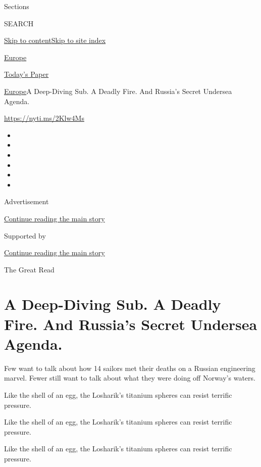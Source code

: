 Sections

SEARCH

\protect\hyperlink{site-content}{Skip to
content}\protect\hyperlink{site-index}{Skip to site index}

\href{https://www.nytimes.com/section/world/europe}{Europe}

\href{https://myaccount.nytimes.com/auth/login?response_type=cookie\&client_id=vi}{}

\href{https://www.nytimes.com/section/todayspaper}{Today's Paper}

\href{/section/world/europe}{Europe}\textbar{}A Deep-Diving Sub. A
Deadly Fire. And Russia's Secret Undersea Agenda.

\url{https://nyti.ms/2Klw4Ms}

\begin{itemize}
\item
\item
\item
\item
\item
\item
\end{itemize}

Advertisement

\protect\hyperlink{after-top}{Continue reading the main story}

Supported by

\protect\hyperlink{after-sponsor}{Continue reading the main story}

The Great Read

\hypertarget{a-deep-diving-sub-a-deadly-fire-and-russias-secret-undersea-agenda}{%
\section{A Deep-Diving Sub. A Deadly Fire. And Russia's Secret Undersea
Agenda.}\label{a-deep-diving-sub-a-deadly-fire-and-russias-secret-undersea-agenda}}

Few want to talk about how 14 sailors met their deaths on a Russian
engineering marvel. Fewer still want to talk about what they were doing
off Norway's waters.

Like the shell of an egg, the Losharik's titanium spheres can resist
terrific pressure.

Like the shell of an egg, the Losharik's titanium spheres can resist
terrific pressure.

Like the shell of an egg, the Losharik's titanium spheres can resist
terrific pressure.

